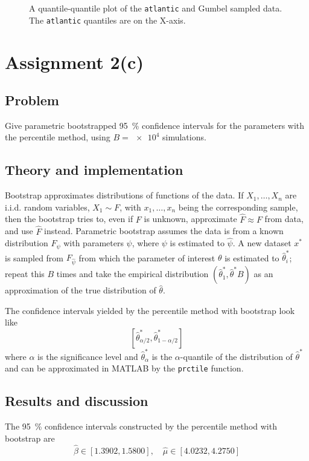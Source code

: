 \documentclass[11pt, a4paper]{article}
\begin{document}
\begin{figure}
	\centering
	
	\caption{A quantile-quantile plot of the \texttt{atlantic} and Gumbel sampled data.
	The \texttt{atlantic} quantiles are on the X-axis. \label{fig:qqplot}}
\end{figure}

\section{Assignment 2(c)}\label{sec:atlantic_param_bootstrap}
\subsection{Problem}
Give parametric bootstrapped \SI{95}{\percent} confidence intervals for the parameters
with the percentile method, using $B = \num{e4}$ simulations.
\subsection{Theory and implementation}
Bootstrap approximates distributions of functions of the data.
If $X_1, \ldots, X_n$ are i.i.d. random variables, $X_1 \sim F$,
with $x_1, \ldots, x_n$ being the corresponding sample,
then the bootstrap tries to, even if $F$ is unknown, approximate $\hat F \approx F$ from data,
and use $\hat F$ instead.
Parametric bootstrap assumes the data is from a known distribution $F_\psi$
with parameters $\psi$, where $\psi$ is estimated to $\hat\psi$.
A new dataset $x^*$ is sampled from $F_{\hat\psi}$
from which the parameter of interest $\theta$ is estimated to $\hat\theta^*_i$;
repeat this $B$ times and take the empirical distribution $(\hat\theta^*_1, \hat\theta^*B)$
as an approximation of the true distribution of $\hat\theta$.

The confidence intervals yielded by the percentile method with bootstrap look like
$$ \left[\hat\theta^*_{\alpha/2}, \hat\theta^*_{1-\alpha/2}\right] $$
where $\alpha$ is the significance level and $\hat\theta^*_\alpha$ is the
$\alpha$-quantile of the distribution of $\hat\theta^*$
and can be approximated in MATLAB by the \texttt{prctile} function.
\subsection{Results and discussion}
The \SI{95}{\percent} confidence intervals constructed by the percentile method with bootstrap are
\begin{equation}\label{eq:atlantic_param_ci}
	\hat\beta \in [\num{1.3902}, \num{1.5800}], \quad \hat\mu \in [\num{4.0232}, \num{4.2750}]
\end{equation}
\end{document}
